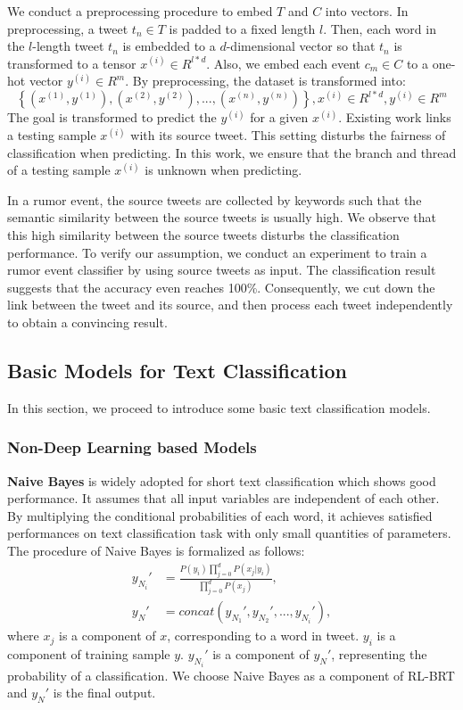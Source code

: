 We conduct a preprocessing procedure to embed $T$ and $C$ into vectors. In preprocessing, a tweet $t_n \in T $ is padded to a fixed length $l$. Then, each word in the $l$-length tweet $t_n$ is embedded to a $d$-dimensional vector so that $t_n$ is transformed to a tensor $x^{(i)} \in R^{l*d}$. Also, we embed each event $c_m \in C$ to a one-hot vector $y^{(i)} \in R^m$. By preprocessing, the dataset is transformed into: $$\left\{ (x^{(1)}, y^{(1)}), (x^{(2)}, y^{(2)}),..., (x^{(n)}, y^{(n)}) \right\}, x^{(i)} \in R^{l*d}, y^{(i)} \in R^m $$ The goal is transformed to predict the $y^{(i)}$ for a given $x^{(i)}$. Existing work \cite{DBLP:conf/www/ChengNB20} links a testing sample $x^{(i)}$ with its source tweet. This setting disturbs the fairness of classification when predicting. In this work, we ensure that the branch and thread of a testing sample $x^{(i)}$ is unknown when predicting.

In a rumor event, the source tweets are collected by keywords such that the semantic similarity between the source tweets is usually high. We observe that this high similarity between the source tweets disturbs the classification performance. To verify our assumption, we conduct an experiment to train a rumor event classifier by using source tweets as input. The classification result suggests that the accuracy even reaches 100\%. Consequently, we cut down the link between the tweet and its source, and then process each tweet independently to obtain a convincing result. 

\subsection{Basic Models for Text Classification}
\label{sec:deeplearning_model} 
In this section, we proceed to introduce some basic text classification models.

\subsubsection{Non-Deep Learning based Models}
\textbf{Naive Bayes} \cite{DBLP:journals/ml/DomingosP97} is widely adopted for short text classification which shows good performance. It assumes that all input variables are independent of each other. By multiplying the conditional probabilities of each word, it achieves satisfied performances on text classification task with only small quantities of parameters. The procedure of Naive Bayes is formalized as follows:
\begin{align}\label{eq:nb}
y_{N_{i}}' &= \frac{P(y_i)\prod_{j = 0}^d P(x_j|y_i)}{\prod_{j = 0}^d P(x_j)},\\
y_N' &= concat(y_{N_{1}}',y_{N_{2}}',..., y_{N_{i}}'),
\end{align}
where $x_j$ is a component of $x$, corresponding to a word in tweet.  $y_i$ is a component of training sample $y$. $y_{N_{i}}'$ is a component of $y_N'$, representing the probability of a classification. We choose Naive Bayes as  a component of RL-BRT and  $y_N'$ is the final output.

